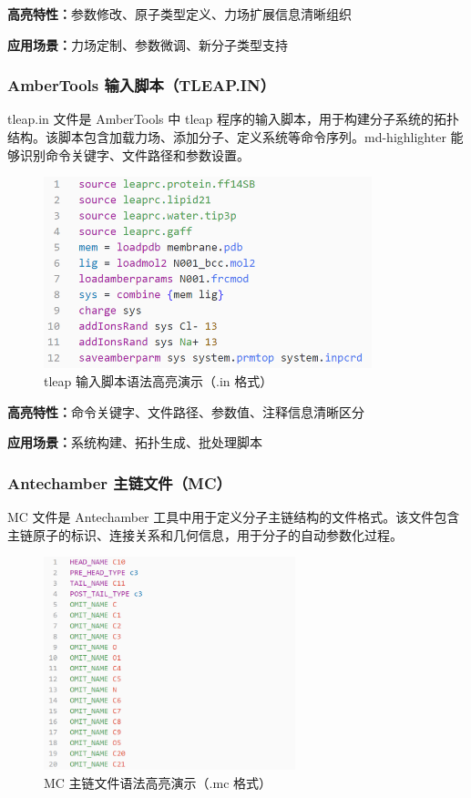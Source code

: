 \textbf{高亮特性：}参数修改、原子类型定义、力场扩展信息清晰组织

\textbf{应用场景：}力场定制、参数微调、新分子类型支持

\subsubsection{AmberTools 输入脚本（TLEAP.IN）}

tleap.in 文件是 AmberTools 中 tleap 程序的输入脚本，用于构建分子系统的拓扑结构。该脚本包含加载力场、添加分子、定义系统等命令序列。md-highlighter 能够识别命令关键字、文件路径和参数设置。

\begin{figure}[!h]
    \centering
    \includegraphics[width=0.85\textwidth]{../images/tleap.in.png}
    \caption{tleap 输入脚本语法高亮演示（.in 格式）}
    \label{fig:tleap-highlighting}
\end{figure}

\textbf{高亮特性：}命令关键字、文件路径、参数值、注释信息清晰区分

\textbf{应用场景：}系统构建、拓扑生成、批处理脚本

\subsubsection{Antechamber 主链文件（MC）}

MC 文件是 Antechamber 工具中用于定义分子主链结构的文件格式。该文件包含主链原子的标识、连接关系和几何信息，用于分子的自动参数化过程。

\begin{figure}[!h]
    \centering
    \includegraphics[width=0.65\textwidth]{../images/mc.png}
    \caption{MC 主链文件语法高亮演示（.mc 格式）}
    \label{fig:mc-highlighting}
\end{figure}

